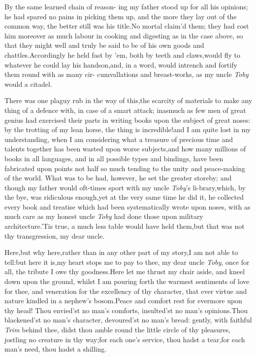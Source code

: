 \documentclass{article}
\begin{document}
By the same learned chain of reason- ing my father stood up
for all his opinions; he had spared no pains in picking them up,
and the more they lay out of the common way, the better still
was his title.\tsh No mortal claim’d them; they had cost him
moreover as much labour in cooking and digesting as in the case
above, so that they might well and truly be said to be of his
own goods and chattles.\tsk Accordingly he held fast by ’em,
both by teeth and claws,\tsk would fly to whatever he could lay
his hands\break on,\tsk and, in a word, would intrench and fortify
them round with as many cir-\break 
cumvallations and breast-works, as my\break
uncle \textit{Toby} would a citadel.

There was one plaguy rub in the way of this,\tsh the
scarcity of materials to make any thing of a defence with, in
case
of a smart attack; inasmuch as few men of great genius had
exercised their parts in writing books upon the subject of\break 
great noses: by the trotting of my lean horse, the thing is
incredible!\@  and I am quite lost in my understanding, when I am
considering what a treasure of precious time and talents
together has been wasted upon worse subjects,\tsk and how many
millions of books in all languages, and in all possible types and
bindings, have been fabricated upon points not half so much
tending to the unity and peace-making of the world.  What was to
be had, however, he set the greater store\break by; and though my
father would oft-times sport with my uncle \textit{Toby}’s
li-\break brary,\tsk which, by the bye, was ridiculous enough,\tsk yet
at the very same time he did it, he collected every book
and treatise which had been systematically wrote upon
noses, with as much care as my honest uncle \textit{Toby} had done
those upon military architecture.\tsh ’Tis true, a
much less table would have held them,\tsk but that was not thy
transgression, my dear uncle.\tsh

Here,\tsh but why here,\tsh rather than in any
other part of my story,\tsh I am not able to
tell:\tsh but here it is,\tsh my heart stops me to
pay to\break
thee, my dear uncle \textit{Toby}, once for all, the tribute I
owe thy goodness.\tsh Here\break
let me thrust my chair aside, and kneel\break
down upon the ground, whilst I am\break
pouring forth the warmest sentiments\break
of love for thee, and veneration for\break
the excellency of thy character, that\break
ever virtue and nature kindled in a
nephew’s bosom.\tsh Peace and comfort rest for evermore upon thy
head!\tsk\break
Thou envied’st no man’s comforts,\tsh\break
insulted’st no man’s opinions.\tsh Thou\break
blackened’st no man’s character,\tsh\break
devoured’st no man’s bread: gently,\break
with faithful \textit{Trim} behind thee, didst\break
thou amble round the little circle of\break
thy pleasures, jostling no creature in\break
thy way;\tsk for each one’s service,\break
thou hadst a tear,\tsk for each man’s\break
need, thou hadst a shilling.
\end{document}
